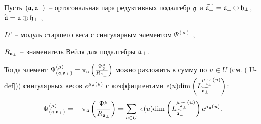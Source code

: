 \begin{lemma}
\label{lemma}
Пусть $\left( \mathfrak{a},\mathfrak{a}_{\perp} \right)$ -- ортогональная пара редуктивных подалгебр $\mathfrak{g}$ и  $\widetilde{\mathfrak{a}_{\perp}}=\mathfrak{a}_{\perp}\oplus \mathfrak{h}_{\perp }$, $\widetilde{\mathfrak{a}}=\mathfrak{a}\oplus\mathfrak{h}_{\perp }$ ,

$L^{\mu }$ -- модуль старшего веса с сингулярным элементом $\Psi ^{\left(\mu \right)}$ ,

$R_{\mathfrak{a}_{\perp }}$ -- знаменатель Вейля для подалгебры $\mathfrak{a}_{\perp }$.

Тогда элемент  $\Psi ^{\left( \mu \right) }_{\left(  \mathfrak{a}, \mathfrak{a}_{\perp} \right)}=\pi _{\mathfrak{a}}\left( \frac{\Psi _{\mathfrak{g}}^{\mu }}{R_{\mathfrak{a}_{\perp }}}\right) $ можно разложить в сумму по  $u\in U$ (см. (\ref{U-def})) сингулярных весов $e^{\mu _{\mathfrak{a}}\left( u\right) }$ с коэффициентами $\epsilon (u)\mathrm{\dim}\left( L_{\widetilde{\mathfrak{a}_{\perp}}}^{\mu _{\widetilde{\mathfrak{a}_{\perp}}}\left( u\right) }\right) $:
\begin{equation}
\Psi ^{\left( \mu \right) }_{\left(  \af, \afb \right)}=\quad \pi _{\af}\left( \frac{\Psi^{\mu }}{R_{\af%
_{\perp }}}\right) =\sum_{u\in U}\;\epsilon (u)\mathrm{\dim }
\left( L_{\widetilde{\af_{\perp }}}^{\mu _{%
\widetilde{\af_{\perp }}}\left( u\right) }\right) e^{\mu _{\af}\left( u \right) }.
\end{equation}
\end{lemma}


